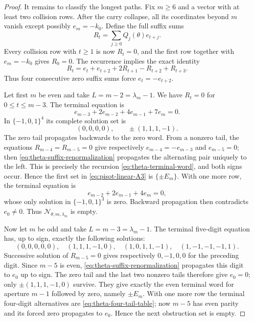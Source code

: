 \begin{proof}
It remains to classify the longest paths.  Fix $m\ge6$ and a vector with
at least two collision rows.  After the carry collapse, all its coordinates
beyond $m$ vanish except possibly $e_m=-k_0$.  Define the full suffix sums
\[
R_t=\sum_{j\ge0}Q_j(\theta)e_{t+j}.
\]
Every collision row with $t\ge1$ is now $R_t=0$, and the first row together
with $e_m=-k_0$ gives $R_0=0$.  The recurrence implies the exact identity
\begin{equation}
R_t=e_t+e_{t+2}+2R_{t+1}-R_{t+2}+R_{t+3}.
\label{eq:theta-suffix-renormalization}
\end{equation}
Thus four consecutive zero suffix sums force $e_t=-e_{t+2}$.

Let first $m$ be even and take $L=m-2=\lambda_m-1$.  We have
$R_t=0$ for $0\le t\le m-3$.  The terminal equation is
\[
e_{m-3}+2e_{m-2}+4e_{m-1}+7e_m=0.
\]
In $\{-1,0,1\}^4$ its complete solution set is
\begin{equation}
(0,0,0,0),\qquad \pm(1,1,1,-1).
\label{eq:theta-four-tail-table}
\end{equation}
The zero tail propagates backwards to the zero word.  From a nonzero tail,
the equations $R_{m-4}=R_{m-5}=0$ give respectively
$e_{m-4}=-e_{m-3}$ and $e_{m-5}=0$; then
\eqref{eq:theta-suffix-renormalization} propagates the alternating pair
uniquely to the left.  This is precisely the recursion
\eqref{eq:theta-terminal-word}, and both signs occur.  Hence the first set
in \eqref{eq:pisot-linear-A3} is $\{\pm E_m\}$.  With one more row, the
terminal equation is
\[
e_{m-2}+2e_{m-1}+4e_m=0,
\]
whose only solution in $\{-1,0,1\}^3$ is zero.  Backward propagation then
contradicts $e_0\ne0$.  Thus $\mathcal N_{\theta,m,\lambda_m}$ is empty.

Now let $m$ be odd and take $L=m-3=\lambda_m-1$.  The terminal five-digit
equation has, up to sign, exactly the following solutions:
\begin{equation}
(0,0,0,0,0),\quad
(1,1,1,-1,0),\quad
(1,0,1,1,-1),\quad
(1,-1,-1,-1,1).
\label{eq:theta-five-tail-table}
\end{equation}
Successive solution of $R_{m-5}=0$ gives respectively
$0,-1,0,0$ for the preceding digit.  Since $m-5$ is even,
\eqref{eq:theta-suffix-renormalization} propagates this digit to $e_0$ up
to sign.  The zero tail and the last two nonzero tails therefore give
$e_0=0$; only $\pm(1,1,1,-1,0)$ survive.  They give exactly the even
terminal word for aperture $m-1$ followed by zero, namely $\pm E_m$.
With one more row the terminal four-digit alternatives are
\eqref{eq:theta-four-tail-table}; now $m-5$ has even parity and its forced
zero propagates to $e_0$.  Hence the next obstruction set is empty.


\end{proof}
